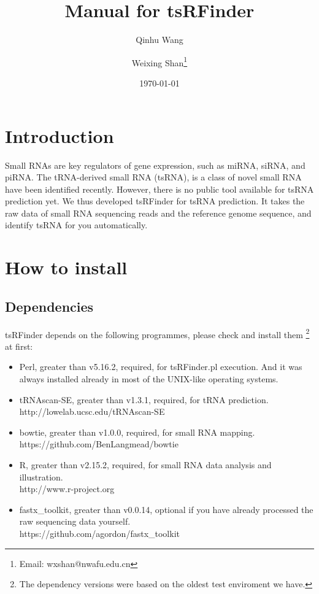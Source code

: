 \documentclass[11pt, a4paper]{article}
\title{Manual for tsRFinder}
\author{Qinhu Wang}
\author{Weixing Shan\thanks{Email: wxshan@nwafu.edu.cn}}
\affil{Northwest A\&F University}
\date{\today}
\begin{document}
\maketitle
\tableofcontents

\section{Introduction}

Small RNAs are key regulators of gene expression, such as miRNA, siRNA, and piRNA. The tRNA-derived small RNA (tsRNA), is a class of novel small RNA have been identified recently. However, there is no public tool available for tsRNA prediction yet. We thus developed tsRFinder for tsRNA prediction. It takes the raw data of small RNA sequencing reads and the reference genome sequence, and identify tsRNA for you automatically.

\section{How to install}

\subsection{Dependencies}

tsRFinder depends on the following programmes, please check and install them \footnote{The dependency versions were based on the oldest test enviroment we have.} at first:


\begin{itemize}

\item Perl, greater than v5.16.2, required, for tsRFinder.pl execution. And it was always installed already in most of the UNIX-like operating systems.
\item tRNAscan-SE, greater than v1.3.1, required, for tRNA prediction. \\http://lowelab.ucsc.edu/tRNAscan-SE
\item bowtie, greater than v1.0.0, required, for small RNA mapping. \\https://github.com/BenLangmead/bowtie
\item R, greater than v2.15.2, required, for small RNA data analysis and illustration. \\http://www.r-project.org
\item fastx\_toolkit, greater than v0.0.14, optional if you have already processed the raw sequencing data yourself. \\https://github.com/agordon/fastx\_toolkit

\end{itemize}
\end{document}
